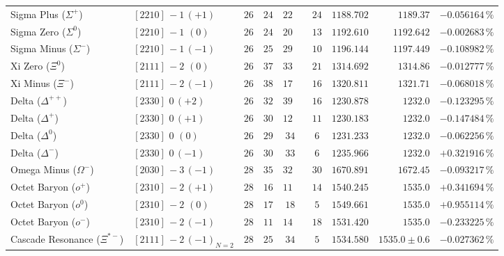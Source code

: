 \documentclass[
    12pt,
    a4paper,
    headings=normal,
    twoside=false,
    open=any,
    parskip=half
]{scrbook}
\begin{document}
\begin{table}[htbp]
\begin{adjustbox}{max width=\textwidth}
\begin{tabular}{llcccrrr}
Sigma Plus ($\Sigma^+$) & $[2210]\,-1\,(+1)$ & $26$ & $24$ & $22 \qquad 24$ & $1188.702$ & $1189.37$ & $-0.056164\,\%$ \\
\rowcolor{secondarycolor!8}
Sigma Zero ($\Sigma^0$) & $[2210]\,-1\,\,(0)$ & $26$ & $24$ & $20 \qquad 13$ & $1192.610$ & $1192.642$ & $-0.002683\,\%$ \\
Sigma Minus ($\Sigma^-$) & $[2210]\,-1\,(-1)$ & $26$ & $25$ & $29 \qquad 10$ & $1196.144$ & $1197.449$ & $-0.108982\,\%$ \\
\rowcolor{secondarycolor!8}
Xi Zero ($\Xi^0$) & $[2111]\,-2\,\,(0)$ & $26$ & $37$ & $33 \qquad 21$ & $1314.692$ & $1314.86$ & $-0.012777\,\%$ \\
Xi Minus ($\Xi^-$) & $[2111]\,-2\,(-1)$ & $26$ & $38$ & $17 \qquad 16$ & $1320.811$ & $1321.71$ & $-0.068018\,\%$ \\
\rowcolor{secondarycolor!8}
Delta (${\Delta^{++}}$) & $[2330]\,\,0\,(+2)$ & $26$ & $32$ & $39 \qquad 16$ & $1230.878$ & $1232.0$ & $-0.123295\,\%$ \\
Delta (${\Delta^+}$) & $[2330]\,\,0\,(+1)$ & $26$ & $30$ & $12 \qquad 11$ & $1230.183$ & $1232.0$ & $-0.147484\,\%$ \\
\rowcolor{secondarycolor!8}
Delta (${\Delta^0}$) & $[2330]\,\,0\,\,(0)$ & $26$ & $29$ & $34 \qquad 6$ & $1231.233$ & $1232.0$ & $-0.062256\,\%$ \\
Delta (${\Delta^-}$) & $[2330]\,\,0\,(-1)$ & $26$ & $30$ & $33 \qquad 6$ & $1235.966$ & $1232.0$ & $+0.321916\,\%$ \\
\rowcolor{secondarycolor!8}
Omega Minus ($\Omega^-$) & $[2030]\,-3\,(-1)$ & $28$ & $35$ & $32 \qquad 30$ & $1670.891$ & $1672.45$ & $-0.093217\,\%$ \\
Octet Baryon ($o^+$) & $[2310]\,-2\,(+1)$ & $28$ & $16$ & $11 \qquad 14$ & $1540.245$ & $1535.0$ & $+0.341694\,\%$ \\
\rowcolor{secondarycolor!8}
Octet Baryon ($o^0$) & $[2310]\,-2\,\,(0)$ & $28$ & $17$ & $18 \qquad 5$ & $1549.661$ & $1535.0$ & $+0.955114\,\%$ \\
Octet Baryon ($o^-$) & $[2310]\,-2\,(-1)$ & $28$ & $11$ & $14 \qquad 18$ & $1531.420$ & $1535.0$ & $-0.233225\,\%$ \\
\rowcolor{secondarycolor!8}
Cascade Resonance ($\Xi^{*-}$) & $[2111]\,-2\,(-1)_{N=2}$ & $28$ & $25$ & $34 \qquad 5$ & $1534.580$ & $1535.0 \pm 0.6$ & $-0.027362\,\%$ \\\bottomrule
\end{tabular}
\end{adjustbox}
\end{table}
\end{document}
